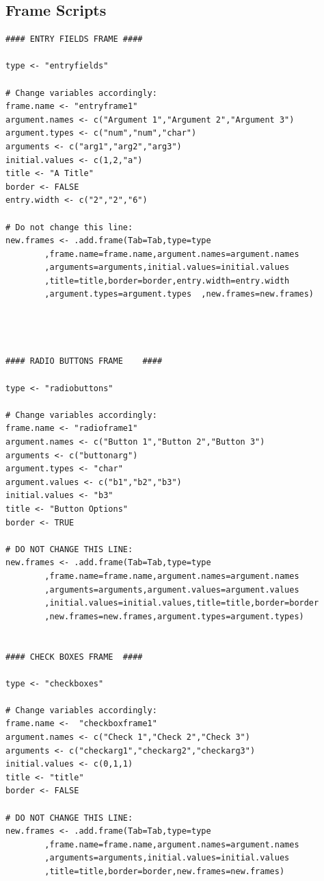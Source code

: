 \documentclass[a4paper]{article}\usepackage[]{graphicx}\usepackage[]{color}
\begin{document}
\subsection{Frame Scripts}
\begin{verbatim}
#### ENTRY FIELDS FRAME ####

type <- "entryfields"

# Change variables accordingly:
frame.name <- "entryframe1"  
argument.names <- c("Argument 1","Argument 2","Argument 3") 
argument.types <- c("num","num","char") 
arguments <- c("arg1","arg2","arg3") 
initial.values <- c(1,2,"a")
title <- "A Title"
border <- FALSE
entry.width <- c("2","2","6")

# Do not change this line:
new.frames <- .add.frame(Tab=Tab,type=type
        ,frame.name=frame.name,argument.names=argument.names
        ,arguments=arguments,initial.values=initial.values
        ,title=title,border=border,entry.width=entry.width
        ,argument.types=argument.types  ,new.frames=new.frames)




#### RADIO BUTTONS FRAME 	####

type <- "radiobuttons"

# Change variables accordingly:
frame.name <- "radioframe1"
argument.names <- c("Button 1","Button 2","Button 3")  
arguments <- c("buttonarg")		
argument.types <- "char" 
argument.values <- c("b1","b2","b3") 
initial.values <- "b3"
title <- "Button Options"
border <- TRUE

# DO NOT CHANGE THIS LINE:
new.frames <- .add.frame(Tab=Tab,type=type
        ,frame.name=frame.name,argument.names=argument.names
        ,arguments=arguments,argument.values=argument.values
        ,initial.values=initial.values,title=title,border=border
        ,new.frames=new.frames,argument.types=argument.types)	


#### CHECK BOXES FRAME  ####

type <- "checkboxes"

# Change variables accordingly:
frame.name <-  "checkboxframe1"
argument.names <- c("Check 1","Check 2","Check 3")  
arguments <- c("checkarg1","checkarg2","checkarg3") 
initial.values <- c(0,1,1)  
title <- "title"
border <- FALSE

# DO NOT CHANGE THIS LINE:
new.frames <- .add.frame(Tab=Tab,type=type
        ,frame.name=frame.name,argument.names=argument.names
        ,arguments=arguments,initial.values=initial.values
        ,title=title,border=border,new.frames=new.frames)



\end{verbatim}
\end{document}
